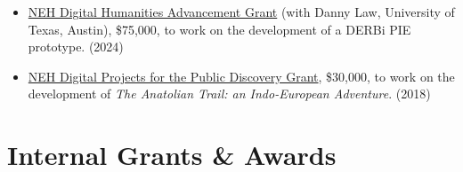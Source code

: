 \documentclass[paper=letter,fontsize=11pt]{scrartcl}
\begin{document}
\begin{itemize}
\item \href{https://apps.neh.gov/PublicQuery/AwardDetail.aspx?gn=HAA-303944-25}{NEH Digital Humanities Advancement Grant} (with Danny Law, University of Texas, Austin), \$75,000, to work on the development of a DERBi PIE prototype. (2024)
\item \href{https://apps.neh.gov/publicquery/AwardDetail.aspx?gn=MD-263922-19}{NEH Digital Projects for the Public Discovery Grant}, \$30,000, to work on the development of \textit{The Anatolian Trail: an Indo-European Adventure}. (2018)
\end{itemize}

\section*{Internal Grants \& Awards}
\end{document}
